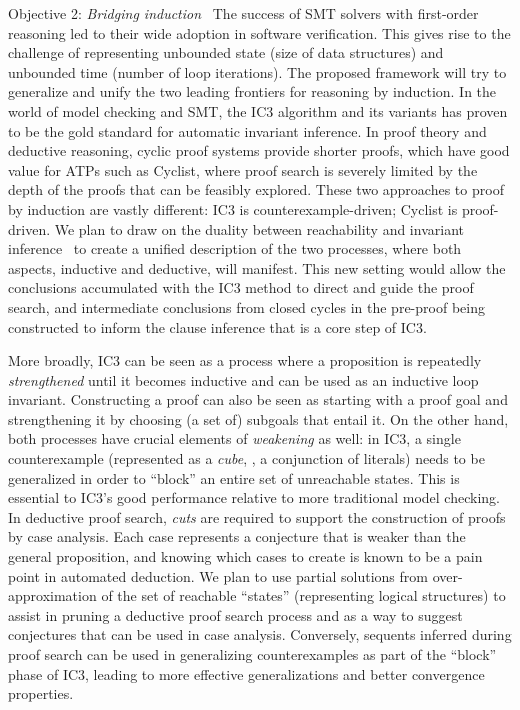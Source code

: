\begin{paragraph}{Objective 2: {\it Bridging induction}}~
The success of SMT solvers with first-order reasoning led to their wide adoption in software verification.
This gives rise to the challenge of representing unbounded state (\eg size of data structures) and unbounded time (\eg number of loop iterations).
The proposed framework will try to generalize and unify the two leading frontiers for reasoning by induction.
In the world of model checking and SMT, the IC3 algorithm and its variants %
has proven to be the gold standard for automatic invariant inference.
In proof theory and deductive reasoning, cyclic proof systems provide shorter proofs, which have good value for ATPs such as Cyclist, where proof search is severely limited by the depth of the proofs that can be feasibly explored.
These two approaches to proof by induction are vastly different: IC3 is counterexample-driven; Cyclist is proof-driven.
We plan to draw on the duality between reachability and invariant inference~\cite{arXiv2020:Padon} to create a unified description of the two processes, where both aspects, inductive and deductive, will manifest.
This new setting would allow the conclusions accumulated with the IC3 method to direct and guide the proof search, and intermediate conclusions from closed cycles in the pre-proof being constructed to inform the clause inference that is a core step of IC3.

More broadly, IC3 can be seen as a process where a proposition is repeatedly \emph{strengthened} until it becomes inductive and can be used as an inductive loop invariant.
Constructing a proof can also be seen as starting with a proof goal and strengthening it by choosing (a set of) subgoals that entail it.
On the other hand, both processes have crucial elements of \emph{weakening} as well: in IC3, a single counterexample (represented as a \emph{cube}, \ie, a conjunction of literals) needs to be generalized in order to ``block'' an entire set of unreachable states.
This is essential to IC3's good performance relative to more traditional model checking.
In deductive proof search, \emph{cuts} are required to support the construction of proofs by case analysis.
Each case represents a conjecture that is weaker than the general proposition, and knowing which  cases to create is known to be a pain point in automated deduction.
We plan to use partial solutions from over-approximation of the set of reachable ``states'' (representing logical structures) to assist in pruning a deductive proof search process and as a way to suggest conjectures that can be used in case analysis.
Conversely, sequents inferred during proof search can be used in generalizing counterexamples as part of the ``block'' phase of IC3, leading to more effective generalizations and better convergence properties.


\end{paragraph}
